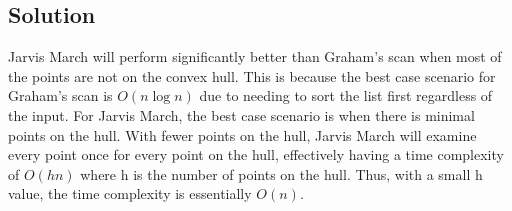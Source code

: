 \subsection*{Solution}

Jarvis March will perform significantly better than Graham's scan when most of the points are not on the convex hull. This is because the best case scenario for Graham's scan is $O(n \log n)$ due to needing to sort the list first regardless of the input. For Jarvis March, the best case scenario is when there is minimal points on the hull. With fewer points on the hull, Jarvis March will examine every point once for every point on the hull, effectively having a time complexity of $O(hn)$ where h is the number of points on the hull. Thus, with a small h value, the time complexity is essentially $O(n)$.
